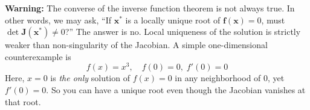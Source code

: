 \begin{warningBox}
    \textbf{Warning:} The converse of the inverse function theorem is not always true. In other words, we may ask, ``If $\mathbf x^*$ is a locally unique root of $\mathbf f(\mathbf x)=0$, must $\det \mathbf J(\mathbf x^*)\neq0$?'' The answer is no. Local uniqueness of the solution is strictly weaker than non-singularity of the Jacobian.  A simple one-dimensional counterexample is
    $$
      f(x) = x^3,\quad f(0)=0,\; f'(0)=0
    $$
    Here, $x=0$ is \textit{the only} solution of $f(x)=0$ in any neighborhood of 0, yet $f'(0)=0$.  So you can have a unique root even though the Jacobian vanishes at that root.
\end{warningBox}





